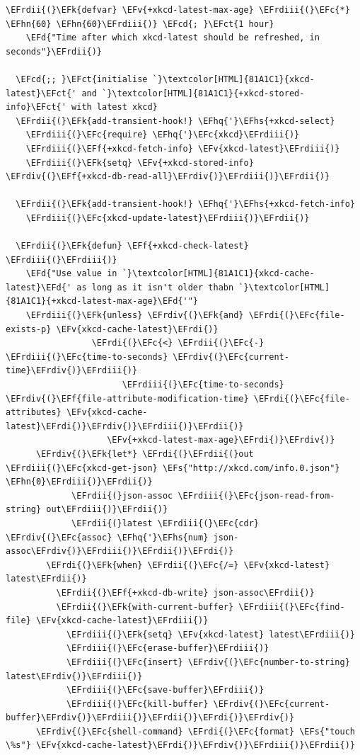 \documentclass{scrartcl}
\newcommand{\EFk}[1]{\textcolor{EFk}{#1}} %
\newcommand{\EFd}[1]{\textcolor{EFd}{#1}} %
\newcommand{\EFs}[1]{\textcolor{EFs}{#1}} %
\newcommand{\EFct}[1]{\textcolor{EFct}{#1}} %
\newcommand{\EFc}[1]{\textcolor{EFc}{#1}} %
\newcommand{\EFv}[1]{\textcolor{EFv}{#1}} %
\newcommand{\EFf}[1]{\textcolor{EFf}{#1}} %
\newcommand{\EFcd}[1]{\textcolor{EFcd}{#1}} %
\newcommand{\EFhn}[1]{#1} %
\newcommand{\EFhq}[1]{#1} %
\newcommand{\EFhs}[1]{#1} %
\newcommand{\EFrdi}[1]{#1} %
\newcommand{\EFrdii}[1]{#1} %
\newcommand{\EFrdiii}[1]{#1} %
\newcommand{\EFrdiv}[1]{#1} %
\begin{document}
\begin{Code}
\begin{Verbatim}[]
  \EFrdii{(}\EFk{defvar} \EFv{+xkcd-latest-max-age} \EFrdiii{(}\EFc{*} \EFhn{60} \EFhn{60}\EFrdiii{)} \EFcd{; }\EFct{1 hour}
    \EFd{"Time after which xkcd-latest should be refreshed, in seconds"}\EFrdii{)}

  \EFcd{;; }\EFct{initialise `}\textcolor[HTML]{81A1C1}{xkcd-latest}\EFct{' and `}\textcolor[HTML]{81A1C1}{+xkcd-stored-info}\EFct{' with latest xkcd}
  \EFrdii{(}\EFk{add-transient-hook!} \EFhq{'}\EFhs{+xkcd-select}
    \EFrdiii{(}\EFc{require} \EFhq{'}\EFc{xkcd}\EFrdiii{)}
    \EFrdiii{(}\EFf{+xkcd-fetch-info} \EFv{xkcd-latest}\EFrdiii{)}
    \EFrdiii{(}\EFk{setq} \EFv{+xkcd-stored-info} \EFrdiv{(}\EFf{+xkcd-db-read-all}\EFrdiv{)}\EFrdiii{)}\EFrdii{)}

  \EFrdii{(}\EFk{add-transient-hook!} \EFhq{'}\EFhs{+xkcd-fetch-info}
    \EFrdiii{(}\EFc{xkcd-update-latest}\EFrdiii{)}\EFrdii{)}

  \EFrdii{(}\EFk{defun} \EFf{+xkcd-check-latest} \EFrdiii{(}\EFrdiii{)}
    \EFd{"Use value in `}\textcolor[HTML]{81A1C1}{xkcd-cache-latest}\EFd{' as long as it isn't older thabn `}\textcolor[HTML]{81A1C1}{+xkcd-latest-max-age}\EFd{'"}
    \EFrdiii{(}\EFk{unless} \EFrdiv{(}\EFk{and} \EFrdi{(}\EFc{file-exists-p} \EFv{xkcd-cache-latest}\EFrdi{)}
                 \EFrdi{(}\EFc{<} \EFrdii{(}\EFc{-} \EFrdiii{(}\EFc{time-to-seconds} \EFrdiv{(}\EFc{current-time}\EFrdiv{)}\EFrdiii{)}
                       \EFrdiii{(}\EFc{time-to-seconds} \EFrdiv{(}\EFf{file-attribute-modification-time} \EFrdi{(}\EFc{file-attributes} \EFv{xkcd-cache-latest}\EFrdi{)}\EFrdiv{)}\EFrdiii{)}\EFrdii{)}
                    \EFv{+xkcd-latest-max-age}\EFrdi{)}\EFrdiv{)}
      \EFrdiv{(}\EFk{let*} \EFrdi{(}\EFrdii{(}out \EFrdiii{(}\EFc{xkcd-get-json} \EFs{"http://xkcd.com/info.0.json"} \EFhn{0}\EFrdiii{)}\EFrdii{)}
             \EFrdii{(}json-assoc \EFrdiii{(}\EFc{json-read-from-string} out\EFrdiii{)}\EFrdii{)}
             \EFrdii{(}latest \EFrdiii{(}\EFc{cdr} \EFrdiv{(}\EFc{assoc} \EFhq{'}\EFhs{num} json-assoc\EFrdiv{)}\EFrdiii{)}\EFrdii{)}\EFrdi{)}
        \EFrdi{(}\EFk{when} \EFrdii{(}\EFc{/=} \EFv{xkcd-latest} latest\EFrdii{)}
          \EFrdii{(}\EFf{+xkcd-db-write} json-assoc\EFrdii{)}
          \EFrdii{(}\EFk{with-current-buffer} \EFrdiii{(}\EFc{find-file} \EFv{xkcd-cache-latest}\EFrdiii{)}
            \EFrdiii{(}\EFk{setq} \EFv{xkcd-latest} latest\EFrdiii{)}
            \EFrdiii{(}\EFc{erase-buffer}\EFrdiii{)}
            \EFrdiii{(}\EFc{insert} \EFrdiv{(}\EFc{number-to-string} latest\EFrdiv{)}\EFrdiii{)}
            \EFrdiii{(}\EFc{save-buffer}\EFrdiii{)}
            \EFrdiii{(}\EFc{kill-buffer} \EFrdiv{(}\EFc{current-buffer}\EFrdiv{)}\EFrdiii{)}\EFrdii{)}\EFrdi{)}\EFrdiv{)}
      \EFrdiv{(}\EFc{shell-command} \EFrdi{(}\EFc{format} \EFs{"touch \%s"} \EFv{xkcd-cache-latest}\EFrdi{)}\EFrdiv{)}\EFrdiii{)}\EFrdii{)}


\end{Verbatim}
\end{Code}
\end{document}
